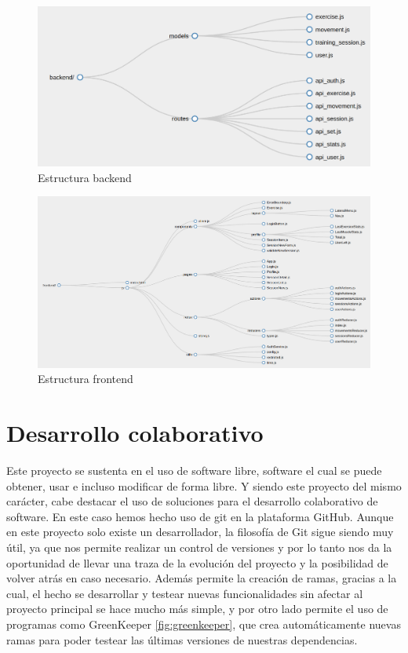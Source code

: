 \begin{figure}
  \begin{center}
    \includegraphics[width=\textwidth]{imagenes/backend.png}
    \caption{Estructura backend}
    \label{fig:backend}
  \end{center}
\end{figure}

\begin{figure}
  \begin{center}
    \includegraphics[width=\textwidth]{imagenes/frontend.png}
    \caption{Estructura frontend}
    \label{fig:frontend}
  \end{center}
\end{figure}


\section{Desarrollo colaborativo}
Este proyecto se sustenta en el uso de software libre, software el cual se puede obtener, usar e incluso modificar de forma libre. Y siendo este proyecto del mismo carácter, cabe destacar el uso de soluciones para el desarrollo colaborativo de software. En este caso hemos hecho uso de \Gls{git} en la plataforma GitHub. Aunque en este proyecto solo existe un desarrollador, la filosofía de Git sigue siendo muy útil, ya que nos permite realizar un control de versiones y por lo tanto nos da la oportunidad de llevar una traza de la evolución del proyecto y la posibilidad de volver atrás en caso necesario. Además permite la creación de ramas, gracias a la cual, el hecho se desarrollar y testear nuevas funcionalidades sin afectar al proyecto principal se hace mucho más simple, y por otro lado permite el uso de programas como GreenKeeper \ref{fig:greenkeeper}, que crea automáticamente nuevas ramas para poder testear las últimas versiones de nuestras dependencias.

